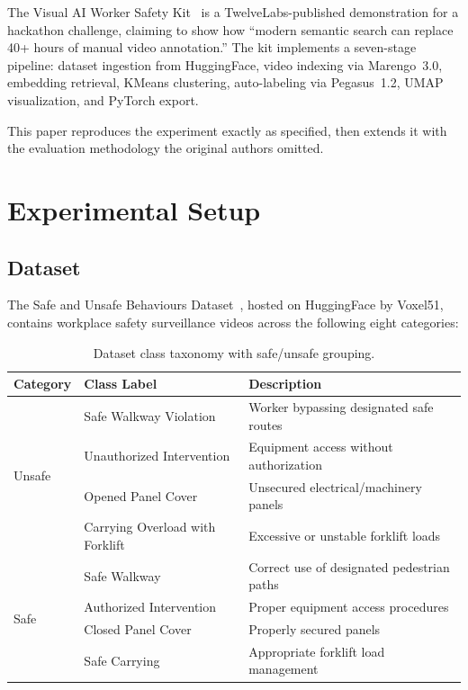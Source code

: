 \documentclass[11pt,a4paper]{article}
\begin{document}
The Visual AI Worker Safety Kit~\cite{workersafetykit} is a TwelveLabs-published demonstration for a hackathon challenge, claiming to show how ``modern semantic search can replace 40+ hours of manual video annotation.'' The kit implements a seven-stage pipeline: dataset ingestion from HuggingFace, video indexing via Marengo~3.0, embedding retrieval, KMeans clustering, auto-labeling via Pegasus~1.2, UMAP visualization, and PyTorch export.

This paper reproduces the experiment exactly as specified, then extends it with the evaluation methodology the original authors omitted.

\section{Experimental Setup}

\subsection{Dataset}

The Safe and Unsafe Behaviours Dataset~\cite{voxel51_dataset}, hosted on HuggingFace by Voxel51, contains workplace safety surveillance videos across the following eight categories:

\begin{table}[H]
\centering
\caption{Dataset class taxonomy with safe/unsafe grouping.}
\label{tab:classes}
\begin{tabular}{@{}lll@{}}
\toprule
\textbf{Category} & \textbf{Class Label} & \textbf{Description} \\
\midrule
\multirow{4}{*}{Unsafe} & Safe Walkway Violation & Worker bypassing designated safe routes \\
 & Unauthorized Intervention & Equipment access without authorization \\
 & Opened Panel Cover & Unsecured electrical/machinery panels \\
 & Carrying Overload with Forklift & Excessive or unstable forklift loads \\
\midrule
\multirow{4}{*}{Safe} & Safe Walkway & Correct use of designated pedestrian paths \\
 & Authorized Intervention & Proper equipment access procedures \\
 & Closed Panel Cover & Properly secured panels \\
 & Safe Carrying & Appropriate forklift load management \\
\bottomrule
\end{tabular}
\end{table}
\end{document}
